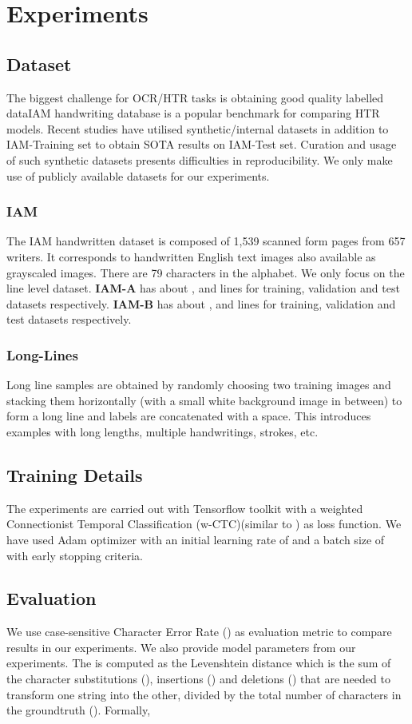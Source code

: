 \documentclass{article}
\begin{document}
\section{Experiments}
\label{sec:headings2}
\subsection{Dataset}
The biggest challenge for OCR/HTR tasks is obtaining good quality labelled dataIAM handwriting database\cite{marti2002iam} is a popular benchmark for comparing HTR models. Recent studies have utilised synthetic/internal datasets in addition to IAM-Training set to obtain SOTA results on IAM-Test set. Curation and usage of such synthetic datasets presents difficulties in reproducibility. We only make use of publicly available datasets for our experiments.


\subsubsection{IAM} \label{iam}The IAM handwritten dataset is composed of 1,539 scanned
form pages from 657 writers. It corresponds to handwritten English text images also available as grayscaled images. There are 79 characters in the alphabet. We only focus on the line level dataset. \textbf{IAM-A} has about ,  and  lines for training, validation and test datasets respectively. \textbf{IAM-B} has about ,  and  lines for training, validation and test datasets respectively. 
\subsubsection{Long-Lines} \label{long-lines}
Long line samples are obtained by randomly choosing two training images and stacking them horizontally (with a small white background image in between) to form a long line and labels are concatenated with a space. This introduces examples with long lengths, multiple handwritings, strokes, etc. 

\subsection{Training Details}
The experiments are carried out with Tensorflow\cite{abadi2016tensorflow} toolkit with a weighted Connectionist Temporal Classification (w-CTC)(similar to \cite{Chaudhary2021EASTER}) as loss function. We have used Adam optimizer with an initial learning rate of  and a batch size of  with early stopping criteria. 
\subsection{Evaluation}
We use case-sensitive Character Error Rate () as evaluation metric to compare results in our experiments. We also provide model parameters from our experiments. The  is computed as the Levenshtein distance which is the
sum of the character substitutions (), insertions () and
deletions () that are needed to transform one string into
the other, divided by the total number of characters in the
groundtruth (). Formally,
\end{document}
